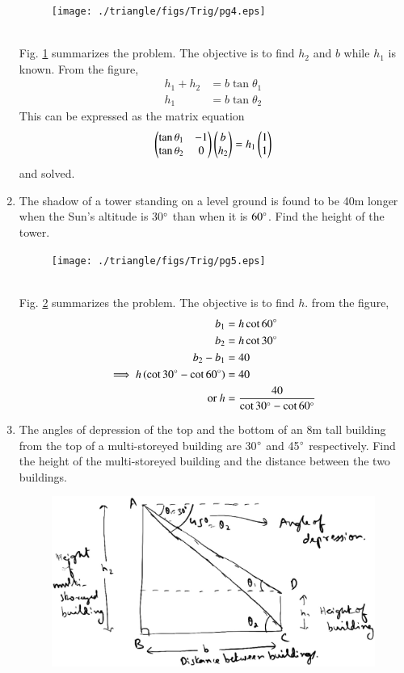 \begin{enumerate}[label=\arabic*.,ref=\thesubsection.\theenumi]
%
\begin{figure}[!ht]
\texttt{[image: ./triangle/figs/Trig/pg4.eps]}
\caption{}
\label{fig:trig_pg4}
\end{figure}
%
\\
\solution Fig. \ref{fig:trig_pg4} summarizes the problem. The objective is to find $h_2$ and $b$ while $h_1$ is known.  From the figure, 
%
\begin{align}
h_1+h_2 &=  b\tan \theta_1
\\
h_1 &= b\tan \theta_2
\end{align}
%
This can be expressed as the matrix equation 
%
\begin{align}
\begin{pmatrix}
\tan \theta_1 & -1
\\
\tan \theta_2 &0
\end{pmatrix}\begin{pmatrix}b\\h_2\end{pmatrix}
= h_1\begin{pmatrix}1\\1\end{pmatrix}
\end{align}
%
and solved.
\item The shadow of a tower standing on a level ground is found to be 40m longer when the Sun's altitude is 30$\degree$ than when it is $60\degree$.  Find the height of the tower.
%
\begin{figure}[!ht]
\texttt{[image: ./triangle/figs/Trig/pg5.eps]}
\caption{}
\label{fig:trig_pg5}
\end{figure}
%
\\
\solution Fig. \ref{fig:trig_pg5} summarizes the problem. The objective is to find $h$.  from the figure,
%
\begin{align}
b_1 &= h\cot 60\degree
\\
b_2 &= h\cot 30\degree
\\
b_2-b_1 &= 40
\\
\implies h \left(\cot 30\degree-\cot 60\degree\right)&= 40
\\
\text{or } h &= \frac{40}{\cot 30\degree-\cot 60\degree}
\end{align}
%
\item The angles of depression of the top and the bottom of an 8m tall building from the top of a multi-storeyed building are 30$\degree$ and 45$\degree$ respectively.  Find the height of the multi-storeyed building and the distance between the two buildings.
%
\begin{figure}[!ht]
\includegraphics[width=\columnwidth]{./triangle/figs/Trig/pg6.eps}

\end{figure}
\end{enumerate}
